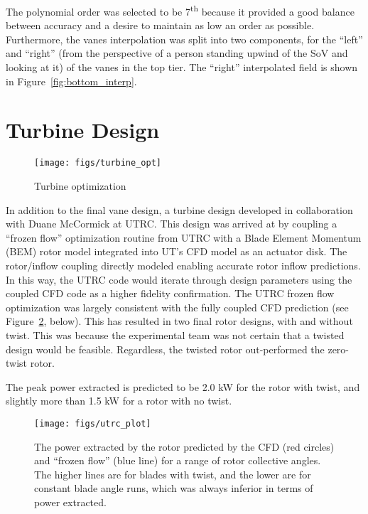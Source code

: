 The polynomial order was selected to be 7\textsuperscript{th} because it
provided a good balance between accuracy and a desire to maintain as low
an order as possible. Furthermore, the vanes interpolation was split
into two components, for the ``left'' and ``right'' (from the perspective of a
person standing upwind of the SoV and looking at it) of the vanes in the
top tier. The ``right'' interpolated field is shown in
Figure~\ref{fig:bottom_interp}. 

%
%

\section{Turbine Design}

  \begin{figure}[!htb]
   \begin{center}
    \texttt{[image: figs/turbine\_opt]}
    \caption{Turbine optimization}
    \label{fig:ut_turbine}
   \end{center}
  \end{figure}

In addition to the final vane design, a turbine design developed in
collaboration with Duane McCormick at UTRC. This design was arrived at
by coupling a ``frozen flow'' optimization routine from UTRC with a Blade
Element Momentum (BEM) rotor model integrated into UT's CFD model as an
actuator disk. The rotor/inflow coupling directly modeled enabling
accurate rotor inflow predictions. In this way, the UTRC code would
iterate through design parameters using the coupled CFD code as a higher
fidelity confirmation. The UTRC frozen flow optimization was largely
consistent with the fully coupled CFD prediction (see
Figure~\ref{fig:UTRC_turbine}, below). This has resulted in two final
rotor designs, with and without twist. This was because the experimental
team was not certain that a twisted design would be
feasible. Regardless, the twisted rotor out-performed the zero-twist
rotor. 

The peak power extracted is predicted to be 2.0 kW for the rotor
with twist, and slightly more than 1.5 kW for a rotor with no twist. 

  \begin{figure}[!htb]
   \begin{center}
    \texttt{[image: figs/utrc\_plot]}
    \caption{The power extracted by the rotor predicted by the CFD (red
    circles) and ``frozen flow'' (blue line) for a range of rotor
    collective angles. The higher lines are for blades with twist, and
    the lower are for constant blade angle runs, which was always
    inferior in terms of power extracted.}
    \label{fig:UTRC_turbine}
   \end{center}
  \end{figure}

